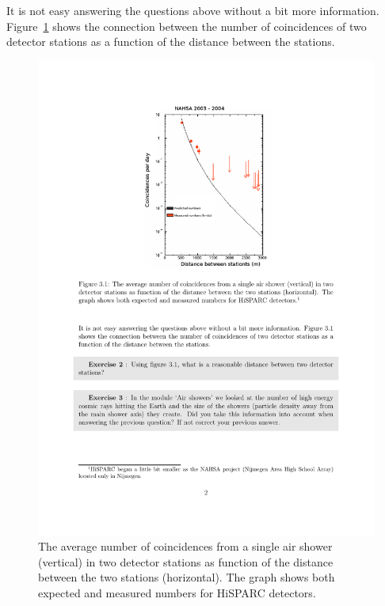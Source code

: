\documentclass[12pt,a4paper]{article}
\numberwithin{equation}{section}
\numberwithin{figure}{section}
\numberwithin{table}{section}
\begin{document}
It is not easy answering the questions above without a bit more information. Figure~\ref{fig:dist_coin} shows the connection between the number of coincidences of two detector stations as a function of the distance between the stations.

\begin{figure}\begin{center}
\includegraphics[scale=0.5]{dist_coin}
\caption{The average number of coincidences from a single air shower (vertical) in two detector stations as function of the distance between the two stations (horizontal). The graph shows both expected and measured numbers for HiSPARC detectors.\protect\footnotemark }\label{fig:dist_coin}
\end{center}\end{figure}
\end{document}

